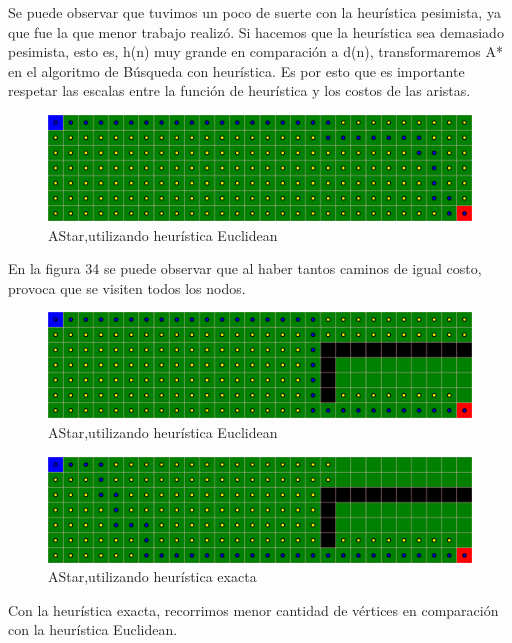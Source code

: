 Se puede observar que tuvimos un poco de suerte con la heurística pesimista, ya que fue la que menor trabajo realizó.
Si hacemos que la heurística sea demasiado pesimista, esto es, h(n) muy grande en comparación a d(n), transformaremos 
A* en el algoritmo de Búsqueda con heurística. Es por esto que es importante respetar las escalas entre la función de heurística y los costos de las aristas.



\begin{figure}[H]
\centering
\includegraphics[width=\textwidth]{AStar/grafo2Euclidean.png}
\caption{AStar,utilizando heurística Euclidean}
\end{figure}

En la figura 34 se puede observar que al haber tantos caminos de igual costo, provoca que se visiten todos los nodos.


\begin{figure}[H]
\centering
\includegraphics[width=\textwidth]{AStar/grafo3Euclidean.png}
\caption{AStar,utilizando heurística Euclidean}
\end{figure}

\begin{figure}[H]
\centering
\includegraphics[width=\textwidth]{AStar/grafo3HeuristicaExacta.png}
\caption{AStar,utilizando heurística exacta}
\end{figure}

Con la heurística exacta, recorrimos menor cantidad de vértices en comparación con la heurística Euclidean.

